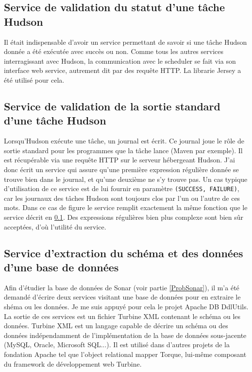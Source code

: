 \subsection{Service de validation du statut d'une tâche Hudson}
\label{BuildSuccessService}

Il était indispensable d'avoir un service permettant de savoir si une tâche 
Hudson donnée a été exécutée avec succès ou non. Comme tous les autres services
interragissant avec Hudson, la communication avec le scheduler se fait via son
interface web service, autrement dit par des requête HTTP. La librarie Jersey 
a été utilisé pour cela.

\subsection{Service de validation de la sortie standard d'une tâche Hudson}

Lorsqu'Hudson exécute une tâche, un journal est écrit. Ce journal joue le 
rôle de sortie standard pour les programmes que la tâche lance (Maven par 
exemple). Il est récupérable via une requête HTTP sur le serveur hébergeant 
Hudson. J'ai donc écrit un service qui assure qu'une première expression 
régulière donnée se trouve bien dans le journal, et qu'une deuxième ne s'y 
trouve pas. Un cas typique d'utilisation de ce service est de lui fournir 
en paramètre \verb|(SUCCESS, FAILURE)|, car les journaux des tâches Hudson 
sont toujours clos par l'un ou l'autre de ces mots. Dans ce cas de figure le 
service remplit exactement la même fonction que le service décrit en 
\ref{BuildSuccessService}. Des expressions régulières bien plus complexe sont 
bien sûr acceptées, d'où l'utilité du service.

\subsection{Service d'extraction du schéma et des données d'une base de données}
\label{DbExtraction}

Afin d'étudier la base de données de Sonar (voir partie \ref{ProbSonar}), il 
m'a été demandé d'écrire deux services visitant une base de données pour en 
extraire le shéma ou les données. Je me suis appuyé pour cela le projet Apache 
DB DdlUtils. La sortie de ces services est un fichier Turbine XML contenant le 
schéma ou les données. Turbine XML est un langage capable de décrire un 
schéma ou des données indépendamment de l'implémentation de la base de données
sous-jacente (MySQL, Oracle, Microsoft SQL...). Il est utilisé dans d'autres 
projets de la fondation Apache tel que l'object relational mapper Torque, 
lui-même composant du framework de développement web Turbine.

